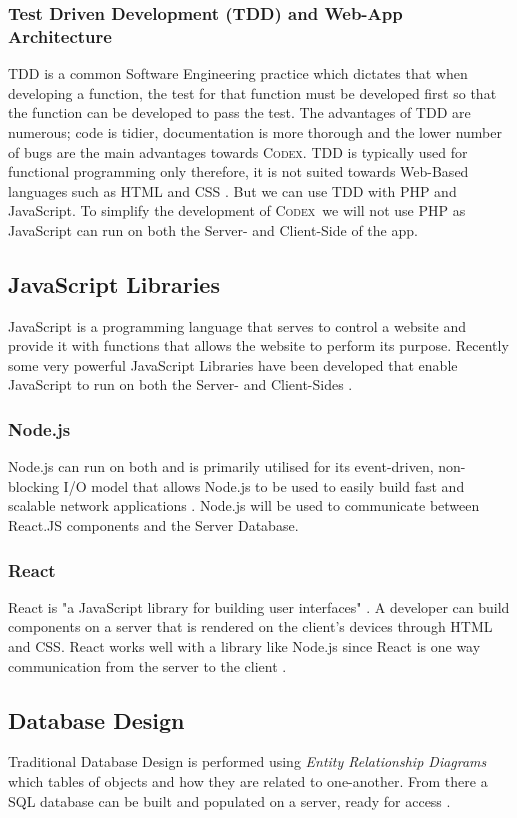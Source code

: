 \documentclass[review]{cmpreport}
\newcommand{\Codex}{\textsc{Codex}}
\begin{document}
	\subsubsection{Test Driven Development (TDD) and Web-App Architecture}
	TDD is a common Software Engineering practice which dictates that when developing a function, the test for that function must be developed first so that the function can be developed to pass the test. The advantages of TDD are numerous; code is tidier, documentation is more thorough and the lower number of bugs are the main advantages towards \Codex. TDD is typically used for functional programming only therefore, it is not suited towards Web-Based languages such as HTML and CSS \citep{TDD}. But we can use TDD with PHP and JavaScript. To simplify the development of \Codex \ we will not use PHP as JavaScript can run on both the Server- and Client-Side of the app.
	
	\subsection{JavaScript Libraries} \label{JavaScript}
	JavaScript is a programming language that serves to control a website and provide it with functions that allows the website to perform its purpose. Recently some very powerful JavaScript Libraries have been developed that enable JavaScript to run on both the Server- and Client-Sides \citep{JavaScriptGuide}.  
	
	\subsubsection{Node.js}
	Node.js can run on both and is primarily utilised for its event-driven, non-blocking I/O model that allows Node.js to be used to easily build fast and scalable network applications \citep{NodejsOfficial}. Node.js will be used to communicate between React.JS components and the Server Database. 
	
	\subsubsection{React}
	React is "a JavaScript library for building user interfaces" \citep{ReactJSOfficial}. A developer can build components on a server that is rendered on the client's devices through HTML and CSS. React works well with a library like Node.js since React is one way communication from the server to the client \citep{MasteringReact}.   

	\subsection{Database Design} \label{Database}
	Traditional Database Design is performed using \emph{Entity Relationship Diagrams} which tables of objects and how they are related to one-another. From there a SQL database can be built and populated on a server, ready for access \citep{DatabaseDesign}. 
	
\end{document}
